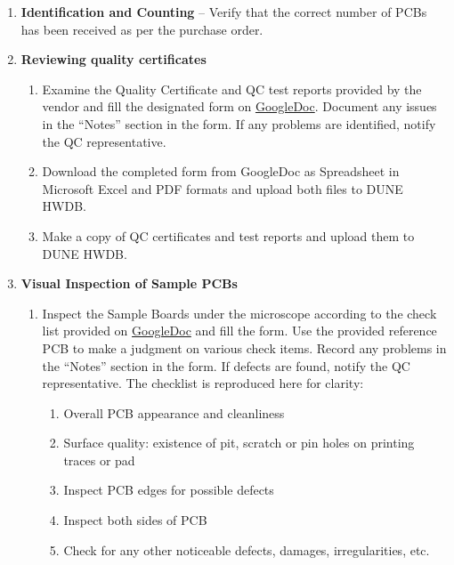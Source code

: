 \documentclass[a4paper,12pt]{article}
\begin{document}
    \begin{enumerate}
        \item \textbf{Identification and Counting} – Verify that the correct number of PCBs has been received as per the purchase order.
        \item \textbf{Reviewing quality certificates}
            \begin{enumerate}
                \item Examine the Quality Certificate and QC test reports provided by the vendor and fill the designated form on \href{https://docs.google.com/spreadsheets/d/10I7u4FrWQXx4R3NOPhapa5DsjlLhDk9keJTLW0Wgq5A/edit?gid=0#gid=0}{GoogleDoc}. Document any issues in the “Notes” section in the form. If any problems are identified, notify the QC representative.
                \item Download the completed form from GoogleDoc as Spreadsheet in Microsoft Excel and PDF formats and upload both files to DUNE HWDB.
                \item Make a copy of QC certificates and test reports and upload them to DUNE HWDB. 
            \end{enumerate}
        \item \textbf{Visual Inspection of Sample PCBs}
            \begin{enumerate}
                \item Inspect the Sample Boards under the microscope according to the check list provided on \href{https://docs.google.com/spreadsheets/d/10I7u4FrWQXx4R3NOPhapa5DsjlLhDk9keJTLW0Wgq5A/edit?gid=0#gid=0}{GoogleDoc} and fill the form. Use the provided reference PCB to make a judgment on various check items. Record any problems in the “Notes” section in the form. If defects are found, notify the QC representative. The checklist is reproduced here for clarity:
                \begin{enumerate}
                        \item Overall PCB appearance and cleanliness 
                        \item Surface quality: existence of pit, scratch or pin holes on printing traces or pad
                        \item Inspect PCB edges for possible defects
                        \item Inspect both sides of PCB
                        \item Check for any other noticeable defects, damages, irregularities, etc.
                    \end{enumerate}

\end{enumerate}
\end{enumerate}
\end{document}
